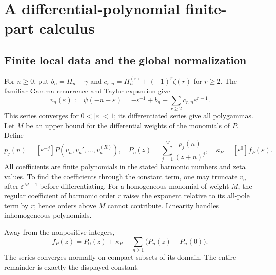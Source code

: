 \section{A differential-polynomial finite-part calculus}
\label{poly:calculus}

\subsection{Finite local data and the global normalization}

For $n\ge0$, put $b_n=H_n-\gamma$ and
$c_{r,n}=H_n^{(r)}+(-1)^r\zeta(r)$ for $r\ge2$. The familiar
Gamma recurrence and Taylor expansion give
\begin{equation}\label{poly:localpsi}
 v_n(\varepsilon):=\psi(-n+\varepsilon)
 =-\varepsilon^{-1}+b_n+
      \sum_{r\ge2}c_{r,n}\varepsilon^{r-1}.
\end{equation}
This series converges for $0<|\varepsilon|<1$; its differentiated
series give all polygammas. Let $M$ be an upper bound for the differential
weights of the monomials of $P$. Define
\begin{equation}\label{poly:poles}
 p_j(n)=[\varepsilon^{-j}]P(v_n,v_n',\ldots,v_n^{(R)}),\quad
 P_n(z)=\sum_{j=1}^M\frac{p_j(n)}{(z+n)^j},\quad
 \kappa_P=[\varepsilon^0]f_P(\varepsilon).
\end{equation}
All coefficients are finite polynomials in the stated harmonic numbers
and zeta values. To find the coefficients through the constant term,
one may truncate $v_n$ after $\varepsilon^{M-1}$ before differentiating.
For a homogeneous monomial of weight $M$, the regular coefficient of
harmonic order $r$ raises the exponent relative to its all-pole term
by $r$; hence orders above $M$ cannot contribute. Linearity handles
inhomogeneous polynomials.

\begin{theorem}
\label{poly:ML}
Away from the nonpositive integers,
\begin{equation}\label{poly:MLeq}
 f_P(z)=P_0(z)+\kappa_P+
              \sum_{n\ge1}\bigl(P_n(z)-P_n(0)\bigr).
\end{equation}
The series converges normally on compact subsets of its domain.
The entire remainder is exactly the displayed constant.
\end{theorem}

